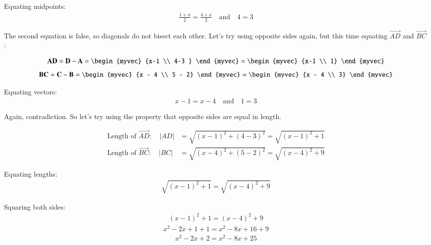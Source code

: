 \documentclass[journal]{IEEEtran}
\begin{document}
Equating midpoints:
\begin{align}
\frac{1 + x}{2} = \frac{4 + x}{2} \quad \text{and} \quad 4 = 3
\end{align}

The second equation is false, so diagonals do not bisect each other. Let's try using opposite sides again, but this time equating $ \vec{AD} $ and $ \vec{BC} $:

\begin{align}
\vec{AD} = \vec{D} -\vec{A} = \begin{myvec}
    {x-1 \\ 4-3 } \end{myvec} =\begin{myvec}
        {x-1 \\ 1}
    \end{myvec}
 \end{align}   
 \begin{align}
\vec{BC} =\vec{C} -\vec{B} = \begin{myvec}
    {x - 4 \\ 5 - 2} \end{myvec} =\begin{myvec}
         {x - 4 \\ 3}
     \end{myvec}
\end{align}

Equating vectors:
\begin{align}
x - 1 = x - 4 \quad \text{and} \quad 1 = 3
\end{align}

Again, contradiction. So let's try using the property that opposite sides are equal in length.

\begin{align}
\text{Length of } \vec{AD}: \quad |AD| &= \sqrt{(x - 1)^2 + (4 - 3)^2} = \sqrt{(x - 1)^2 + 1} \\
\text{Length of } \vec{BC}: \quad |BC| &= \sqrt{(x - 4)^2 + (5 - 2)^2} = \sqrt{(x - 4)^2 + 9}
\end{align}

Equating lengths:
\begin{align}
\sqrt{(x - 1)^2 + 1} = \sqrt{(x - 4)^2 + 9}
\end{align}

Squaring both sides:
\begin{align}
(x - 1)^2 + 1 = (x - 4)^2 + 9
\end{align}
\begin{align}
x^2 - 2x + 1 + 1 = x^2 - 8x + 16 + 9
\end{align}
\begin{align}
x^2 - 2x + 2 = x^2 - 8x + 25
\end{align}
\end{document}
